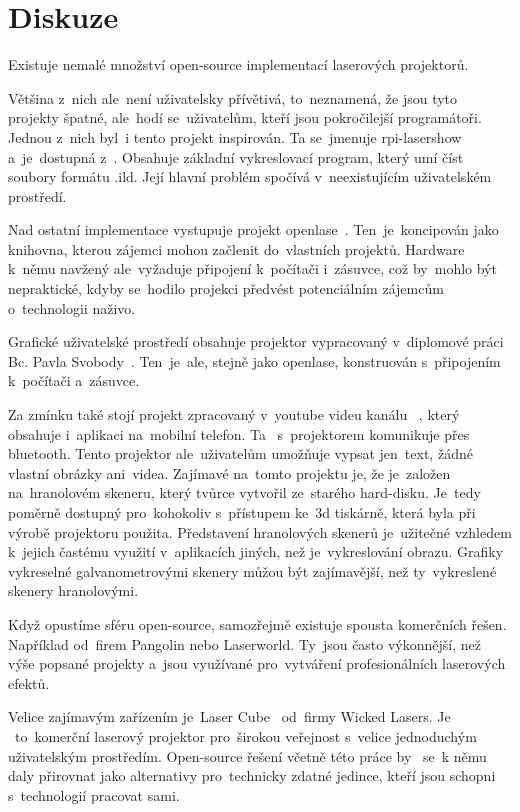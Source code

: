 \chapter{Diskuze}

Existuje nemalé množství open-source implementací laserových projektorů.

Většina  z~nich  ale~není uživatelsky přívětivá, to~neznamená, že jsou tyto projekty špatné,  ale~hodí se~uživatelům, kteří jsou pokročilejší programátoři. 
Jednou  z~nich  byl~i tento projekt inspirován.
Ta se~jmenuje rpi-lasershow  a~je~dostupná z~\cite{rpi-lasershow}. Obsahuje základní vykreslovací program, který umí číst soubory formátu .ild. Její hlavní problém spočívá  v~neexistujícím uživatelském prostředí.

Nad ostatní implementace vystupuje projekt openlase~\cite{openlase}.  Ten~je~koncipován jako knihovna, kterou zájemci mohou začlenit do~vlastních projektů.
Hardware  k~němu navžený  ale~vyžaduje připojení  k~počítači  i~zásuvce, což by~mohlo být nepraktické, kdyby se~hodilo projekci předvést potenciálním zájemcům  o~technologii naživo.

Grafické uživatelské prostředí obsahuje projektor vypracovaný  v~diplomové práci Bc. Pavla Svobody~\cite{vut-chabr}.  Ten~je~ale, stejně jako openlase, konstruován  s~připojením  k~počítači  a~zásuvce.

Za zmínku také stojí projekt zpracovaný  v~youtube videu kanálu ~\cite{harddrive-projector-youtube}, který obsahuje  i~aplikaci na~mobilní telefon. Ta ~s~projektorem komunikuje přes bluetooth. Tento projektor  ale~uživatelům umožňuje vypsat  jen~text, žádné vlastní obrázky  ani~videa.
Zajímavé na~tomto projektu je, že je~založen na~hranolovém skeneru, který tvůrce vytvořil ze~starého hard-disku. Je~tedy poměrně dostupný  pro~kohokoliv  s~přístupem ke~3d tiskárně, která byla při výrobě projektoru použita.
Představení hranolových skenerů je~užitečné vzhledem  k~jejich častému využití  v~aplikacích jiných, než je~vykreslování obrazu. Grafiky vykreselné galvanometrovými skenery můžou být zajímavější, než ty~vykreslené skenery hranolovými.

Když opustíme sféru open-source, samozřejmě existuje spousta komerčních řešen. Například od~firem Pangolin nebo Laserworld. Ty~jsou často výkonnější, než výše popsané projekty  a~jsou využívané  pro~vytváření profesionálních laserových efektů.

Velice zajímavým zařízením je~Laser Cube~\cite{lasercube} od~firmy Wicked Lasers. Je ~to~komerční laserový projektor  pro~širokou veřejnost  s~velice jednoduchým uživatelským prostředím. Open-source řešení včetně této práce by ~se~k němu daly přirovnat jako alternativy  pro~technicky zdatné jedince, kteří jsou schopni  s~technologií pracovat sami.
